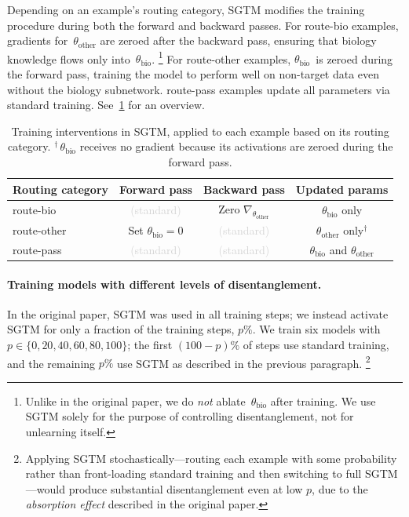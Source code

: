 \documentclass{article} %
\begin{document}
Depending on an example's routing category, SGTM modifies the training procedure during both the forward and backward passes.
For route-bio examples, gradients for~$\theta_\text{other}$ are zeroed after the backward pass, ensuring that biology knowledge flows only into~$\theta_\text{bio}$.
\footnote{Unlike in the original paper, we do \emph{not} ablate~$\theta_\text{bio}$ after training.
We use SGTM solely for the purpose of controlling disentanglement, not for unlearning itself.}
For route-other examples, $\theta_\text{bio}$~is zeroed during the forward pass, training the model to perform well on non-target data even without the biology subnetwork.
route-pass examples update all parameters via standard training.
See~\cref{tab:interventions} for an overview.

\begin{table}[t]
  \centering
  \small
  \begin{tabular}{@{}lccc@{}}
    \toprule
    \textbf{Routing category} & \textbf{Forward pass} & \textbf{Backward pass} & \textbf{Updated params} \\
    \midrule
    route-bio & \textcolor{lightgray}{(standard)} & Zero $\nabla_{\theta_\text{other}}$ & $\theta_\text{bio}$ only \\
    route-other & Set $\theta_\text{bio} = 0$ &  \textcolor{lightgray}{(standard)} & $\theta_\text{other}$ only$^{\dagger}$ \\
    route-pass &  \textcolor{lightgray}{(standard)} &  \textcolor{lightgray}{(standard)} & $\theta_\text{bio}$ and $\theta_\text{other}$ \\
    \bottomrule
  \end{tabular}
  \caption{Training interventions in SGTM, applied to each example based on its routing category.
  $^{\dagger}$\,$\theta_\text{bio}$ receives no gradient because its activations are zeroed during the forward pass.}
  \label{tab:interventions}
\end{table}


\paragraph{Training models with different levels of disentanglement.}
In the original paper, SGTM was used in all training steps; we instead activate SGTM for only a fraction of the training steps, $p\%$.
We train six models with $p \in \{0, 20, 40, 60, 80, 100\}$;
the first $(100{-}p)\%$ of steps use standard training, and the remaining $p\%$ use SGTM as described in the previous paragraph.
\footnote{Applying SGTM stochastically---routing each example with some probability rather than front-loading standard training and then switching to full SGTM---would produce substantial disentanglement even at low $p$, due to the \emph{absorption effect} described in the original paper.}
\end{document}
